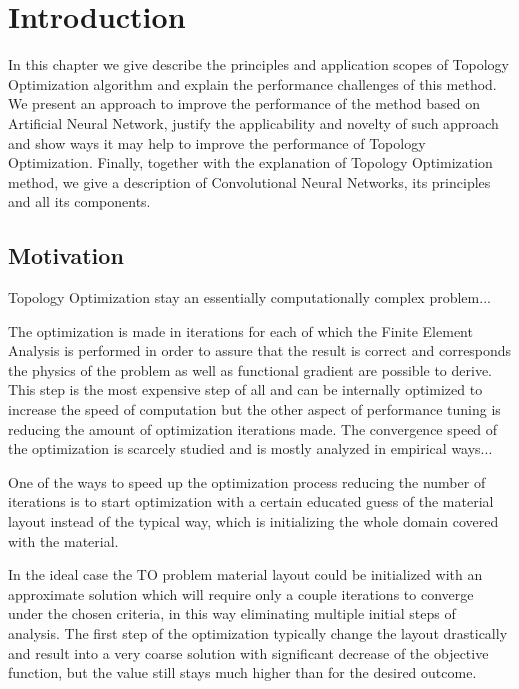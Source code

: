 
\chapter{Introduction}
\label{chapter:Introduction}

In this chapter we give describe the principles and application scopes of Topology Optimization algorithm and explain the performance challenges of this method.
We present an approach to improve the performance of the method based on Artificial Neural Network, justify the applicability and novelty of such approach and show ways it may help to improve the performance of Topology Optimization. 
Finally, together with the explanation of Topology Optimization method, we give a description of Convolutional Neural Networks, its principles and all its components.


\section{Motivation}

Topology Optimization stay an essentially computationally complex problem...
\bigskip

The optimization is made in iterations for each of which the Finite Element Analysis is performed in order to assure that the result is correct and corresponds the physics of the problem as well as functional gradient are possible to derive.
This step is the most expensive step of all and can be internally optimized to increase the speed of computation but the other aspect of performance tuning is reducing the amount of optimization iterations made.
The convergence speed of the optimization is scarcely studied and is mostly analyzed in empirical ways...
\bigskip

One of the ways to speed up the optimization process reducing the number of iterations is to start optimization with a certain educated guess of the material layout instead of the typical way, which is initializing the whole domain covered with the material.

\bigskip
In the ideal case the TO problem material layout could be initialized with an approximate solution which will require only a couple iterations to converge under the chosen criteria, in this way eliminating multiple initial steps of analysis.
The first step of the optimization typically change the layout drastically and result into a very coarse solution with significant decrease of the objective function, but the value still stays much higher than for the desired outcome. 
\bigskip

